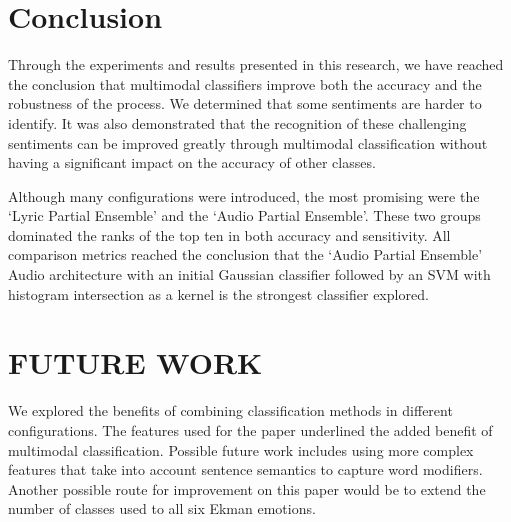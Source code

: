 \chapter{Conclusion}

Through the experiments and results presented in this research, we have reached the conclusion that 
multimodal classifiers improve both the accuracy and the robustness of the process.  We 
determined that some sentiments are harder to identify. It was also demonstrated that the recognition of these
challenging sentiments can be improved greatly through multimodal classification without having a significant 
impact on the accuracy of other classes. 


Although many configurations were introduced, the most promising were the \lq Lyric Partial Ensemble' and the \lq Audio Partial
Ensemble'. These two groups dominated the ranks of the top ten in both accuracy and sensitivity. 
All comparison metrics reached the conclusion that the \lq Audio Partial
Ensemble' Audio architecture with an initial Gaussian classifier followed
by an SVM with histogram intersection as a kernel is the strongest classifier explored.



\chapter{FUTURE WORK}
We explored the benefits of combining classification methods in 
different configurations.  The features used for 
the paper underlined the added benefit of multimodal 
classification. Possible future work includes using more complex features that 
take into account sentence semantics to capture word modifiers. Another 
possible route for improvement on this paper would be to extend the number 
of classes used to all six Ekman emotions. 


